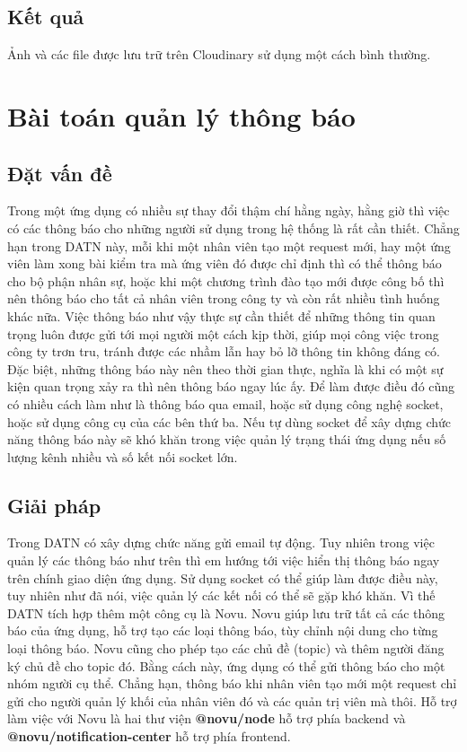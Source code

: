 \documentclass[../DoAn.tex]{subfiles}
\begin{document}
\subsection{Kết quả}
Ảnh và các file được lưu trữ trên Cloudinary sử dụng một cách bình thường.


\section{Bài toán quản lý thông báo}
\subsection{Đặt vấn đề}
Trong một ứng dụng có nhiều sự thay đổi thậm chí hằng ngày, hằng giờ thì việc có các thông báo cho những người sử dụng trong hệ thống là rất cần thiết. Chẳng hạn trong DATN này, mỗi khi một nhân viên tạo một request mới, hay một ứng viên làm xong bài kiểm tra mà ứng viên đó được chỉ định thì có thể thông báo cho bộ phận nhân sự, hoặc khi một chương trình đào tạo mới được công bố thì nên thông báo cho tất cả nhân viên trong công ty và còn rất nhiều tình huống khác nữa. Việc thông báo như vậy thực sự cần thiết để những thông tin quan trọng luôn được gửi tới mọi người một cách kịp thời, giúp mọi công việc trong công ty trơn tru, tránh được các nhầm lẫn hay bỏ lỡ thông tin không đáng có. Đặc biệt, những thông báo này nên theo thời gian thực, nghĩa là khi có một sự kiện quan trọng xảy ra thì nên thông báo ngay lúc ấy. Để làm được điều đó cũng có nhiều cách làm như là thông báo qua email, hoặc sử dụng công nghệ socket, hoặc sử dụng công cụ của các bên thứ ba. Nếu tự dùng socket để xây dựng chức năng thông báo này sẽ khó khăn trong việc quản lý trạng thái ứng dụng nếu số lượng kênh nhiều và số kết nối socket lớn.

\subsection{Giải pháp}
Trong DATN có xây dựng chức năng gửi email tự động. Tuy nhiên trong việc quản lý các thông báo như trên thì em hướng tới việc hiển thị thông báo ngay trên chính giao diện ứng dụng. Sử dụng socket có thể giúp làm được điều này, tuy nhiên như đã nói, việc quản lý các kết nối có thể sẽ gặp khó khăn. Vì thế DATN tích hợp thêm một công cụ là Novu\cite{Novu}. Novu giúp lưu trữ tất cả các thông báo của ứng dụng, hỗ trợ tạo các loại thông báo, tùy chỉnh nội dung cho từng loại thông báo. Novu cũng cho phép tạo các chủ đề (topic) và thêm người đăng ký chủ đề cho topic đó. Bằng cách này, ứng dụng có thể gửi thông báo cho một nhóm người cụ thể. Chẳng hạn, thông báo khi nhân viên tạo mới một request chỉ gửi cho người quản lý khối của nhân viên đó và các quản trị viên mà thôi. Hỗ trợ làm việc với Novu là hai thư viện \textbf{@novu/node} hỗ trợ phía backend và \textbf{@novu/notification-center} hỗ trợ phía frontend. 
\end{document}
